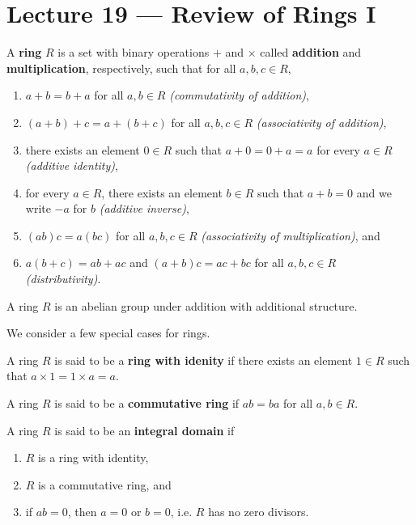 \section{Lecture 19 — Review of Rings I}

\begin{definition}[ring]
	A \textbf{ring} $R$ is a set with binary operations $+$ and $\times$ called \textbf{addition} and \textbf{multiplication}, respectively, such that for all $a,b,c\in R$,
	\begin{enumerate}
		\item $a+b=b+a$ for all $a,b\in R$ \textit{(commutativity of addition)},
		\item $(a+b)+c=a+(b+c)$ for all $a,b,c\in R$ \textit{(associativity of addition)},
		\item there exists an element $0\in R$ such that $a+0=0+a=a$ for every $a\in R$ \textit{(additive identity)},
		\item for every $a\in R$, there exists an element $b\in R$ such that $a+b=0$ and we write $-a$ for $b$ \textit{(additive inverse)},
		\item $(ab)c=a(bc)$ for all $a,b,c\in R$ \textit{(associativity of multiplication)}, and
		\item $a(b+c)=ab+ac$ and $(a+b)c=ac+bc$ for all $a,b,c\in R$ \textit{(distributivity)}.
	\end{enumerate}
\end{definition}

\begin{remark}
	A ring $R$ is an abelian group under addition with additional structure.
\end{remark}

We consider a few special cases for rings.

\begin{definition}
	A ring $R$ is said to be a \textbf{ring with idenity} if there exists an element $1\in R$ such that $a\times 1=1\times a=a$.
\end{definition}

\begin{definition}
	A ring $R$ is said to be a \textbf{commutative ring} if $ab=ba$ for all $a,b\in R$.
\end{definition}

\begin{definition}
	A ring $R$ is said to be an \textbf{integral domain} if
	\begin{enumerate}
		\item $R$ is a ring with identity,
		\item $R$ is a commutative ring, and
		\item if $ab=0$, then $a=0$ or $b=0$, i.e. $R$ has no zero divisors.
	\end{enumerate}
\end{definition}

